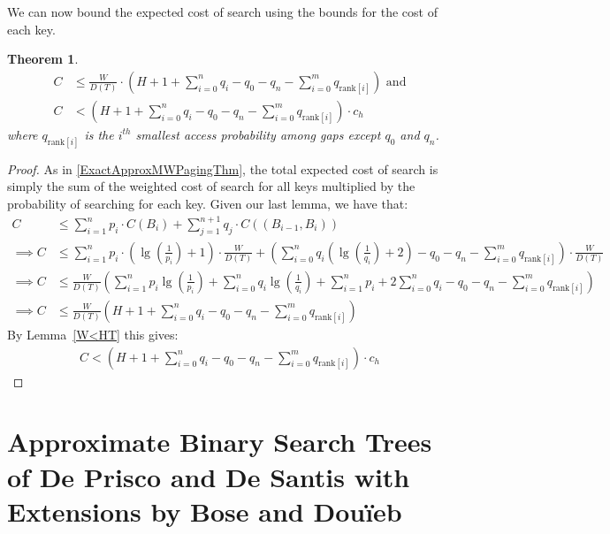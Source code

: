 \documentclass[letterpaper,12pt,titlepage,oneside,final]{book}
\theoremstyle{plain}
\newtheorem{thm}{Theorem}[section]
\begin{document}
We can now bound the expected cost of search using the bounds for the cost of each key.

\begin{thm} \label{ApproxMWPagingThm}
\begin{align*}
C &\leq  \frac{W}{D(T)} \cdot  \left(H + 1 + \sum_{i=0}^n q_i - q_0 - q_n - \sum_{i=0}^m q_{\text{rank}[i]} \right) \text{ and}\\
C &< \left(H + 1 + \sum_{i=0}^n q_i - q_0 - q_n - \sum_{i=0}^m q_{\text{rank}[i]} \right) \cdot  c_h
\end{align*}
where $q_{\text{rank}[i]}$ is the $i^{th}$ smallest access probability among gaps except $q_0$ and $q_n$.
\end{thm}

\begin{proof}
As in \ref{ExactApproxMWPagingThm}, the total expected cost of search is simply the sum of the weighted cost of search for all keys multiplied by the probability of searching for each key. Given our last lemma, we have that:
\begin{align*}
C &\leq \sum_{i=1}^{n} p_i\cdot C(B_i) + \sum_{j=1}^{n+1} q_j\cdot C((B_{i-1},B_i)) \\
\implies C &\leq \sum_{i=1}^{n} p_i\cdot (\lg(\frac{1}{p_i})+1)\cdot \frac{W}{D(T)} + \left(\sum_{i=0}^{n} q_i(\lg(\frac{1}{q_i})+2) - q_0 - q_n -  \sum_{i=0}^m q_{\text{rank}[i]} \right)\cdot \frac{W}{D(T)} \\
\implies C &\leq \frac{W}{D(T)} \left(\sum_{i=1}^{n} p_i\lg(\frac{1}{p_i}) + \sum_{i=0}^{n} q_i\lg(\frac{1}{q_i}) + \sum_{i=1}^{n} p_i + 2\sum_{i=0}^{n} q_i - q_0 - q_n - \sum_{i=0}^m q_{\text{rank}[i]} \right) \\
\implies C &\leq  \frac{W}{D(T)} \left(H + 1 + \sum_{i=0}^n q_i - q_0 - q_n - \sum_{i=0}^m q_{\text{rank}[i]} \right)
\end{align*}
By Lemma~\ref{W<HT} this gives:
\begin{align*}
C < \left(H + 1 + \sum_{i=0}^n q_i - q_0 - q_n - \sum_{i=0}^m q_{\text{rank}[i]} \right) \cdot  c_h
\end{align*}

\end{proof}


\section{Approximate Binary Search Trees of De Prisco and De Santis with Extensions by Bose and Dou\"{i}eb} \label{sec:deBST}
\end{document}
